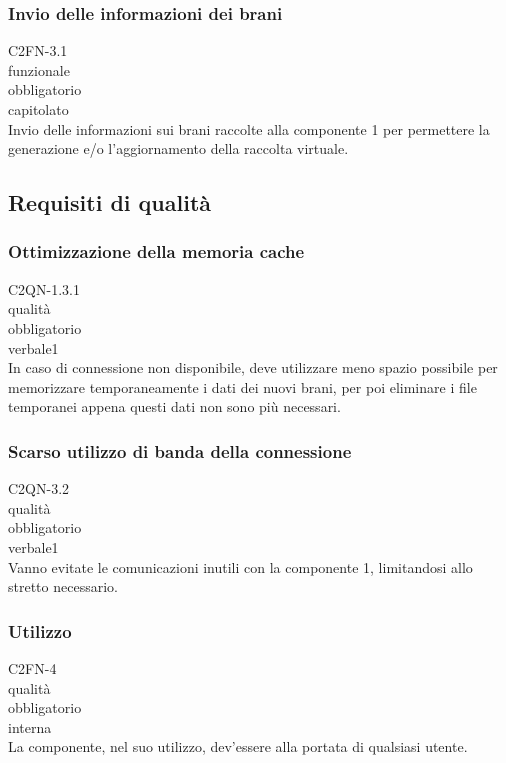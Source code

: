 \subsubsection*{Invio delle informazioni dei brani}
 C2FN-3.1 \\
 funzionale \\
 obbligatorio \\
 capitolato \\
Invio delle informazioni sui brani raccolte alla componente 1 per permettere la
generazione e/o l'aggiornamento della raccolta virtuale.

\subsection{Requisiti di qualit\`a}
\subsubsection*{Ottimizzazione della memoria cache}
 C2QN-1.3.1 \\
 qualit\`a \\
 obbligatorio \\
 verbale1 \\
In caso di connessione non disponibile, deve utilizzare meno spazio possibile
per memorizzare temporaneamente i dati dei nuovi brani, per poi eliminare i file
temporanei appena questi dati non sono pi\`u necessari.

\subsubsection*{Scarso utilizzo di banda della connessione}
 C2QN-3.2 \\
 qualit\`a \\
 obbligatorio \\
 verbale1 \\
Vanno evitate le comunicazioni inutili con la componente 1, limitandosi allo
stretto necessario.

\subsubsection*{Utilizzo}
 C2FN-4\\
 qualit\`a \\
 obbligatorio \\
 interna \\
La componente, nel suo utilizzo, dev'essere alla portata di qualsiasi utente.

